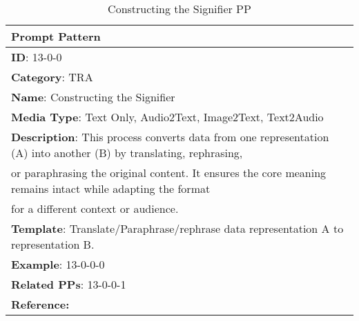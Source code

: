 \begin{table}[h!]
\fontsize{9pt}{10pt}\selectfont
\centering
\caption{Constructing the Signifier PP}
\label{tab:Constructing_the_Signifier_PP}
\begin{tabular}{|l|}
    \hline
    \textbf{Prompt Pattern} \\ \hline
    \textbf{ID}: 13-0-0\\ 
    \textbf{Category}: TRA\\ 
    \textbf{Name}: Constructing the Signifier \\ 
    \textbf{Media Type}: Text Only, Audio2Text, Image2Text, Text2Audio\\ 
    \textbf{Description}: This process converts data from one representation (A) into another (B) by translating, rephrasing, \\or paraphrasing the original content. It ensures the core meaning remains intact while adapting the format \\for a different context or audience. \\ 
    \textbf{Template}: Translate/Paraphrase/rephrase  data representation A to representation B.\\ 
    \textbf{Example}: 13-0-0-0\\ 
    \textbf{Related PPs}: 13-0-0-1\\ 
    \textbf{Reference:} \cite{Reynolds2021PromptParadigm}\\ \hline
\end{tabular}
\end{table}
            

